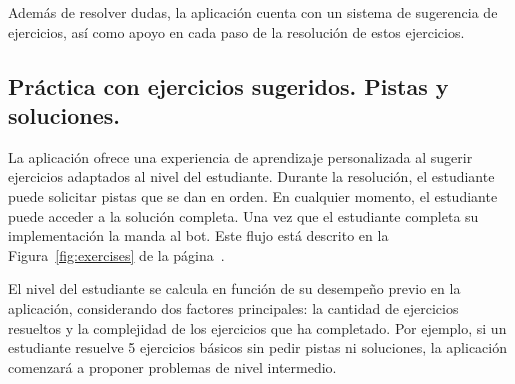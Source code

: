 Además de resolver dudas, la aplicación cuenta con un sistema de sugerencia de ejercicios, así como apoyo en cada paso de la resolución de estos ejercicios.

\subsection{Práctica con ejercicios sugeridos. Pistas y soluciones.}

La aplicación ofrece una experiencia de aprendizaje personalizada al sugerir ejercicios adaptados al nivel del estudiante. Durante la resolución, el estudiante puede solicitar pistas que se dan en orden. En cualquier momento, el estudiante puede acceder a la solución completa. Una vez que el estudiante completa su implementación la manda al bot. Este flujo está descrito en la Figura~\ref{fig:exercises} de la página~\pageref{fig:exercises}.

El nivel del estudiante se calcula en función de su desempeño previo en la aplicación, considerando dos factores principales: la cantidad de ejercicios resueltos y la complejidad de los ejercicios que ha completado. Por ejemplo, si un estudiante resuelve 5 ejercicios básicos sin pedir pistas ni soluciones, la aplicación comenzará a proponer problemas de nivel intermedio.

